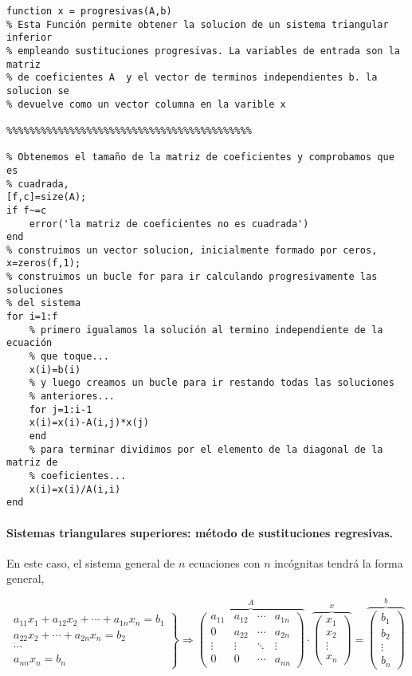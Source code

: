 \begin{lstlisting}
function x = progresivas(A,b)
% Esta Función permite obtener la solucion de un sistema triangular inferior
% empleando sustituciones progresivas. La variables de entrada son la matriz
% de coeficientes A  y el vector de terminos independientes b. la solucion se
% devuelve como un vector columna en la varible x

%%%%%%%%%%%%%%%%%%%%%%%%%%%%%%%%%%%%%%%%%%%

% Obtenemos el tamaño de la matriz de coeficientes y comprobamos que es
% cuadrada,
[f,c]=size(A);
if f~=c
    error('la matriz de coeficientes no es cuadrada')
end
% construimos un vector solucion, inicialmente formado por ceros,
x=zeros(f,1);
% construimos un bucle for para ir calculando progresivamente las soluciones
% del sistema
for i=1:f
    % primero igualamos la solución al termino independiente de la ecuación
    % que toque...
    x(i)=b(i)
    % y luego creamos un bucle para ir restando todas las soluciones
    % anteriores...
    for j=1:i-1
    x(i)=x(i)-A(i,j)*x(j)
    end
    % para terminar dividimos por el elemento de la diagonal de la matriz de
    % coeficientes...
    x(i)=x(i)/A(i,i)
end
\end{lstlisting}

\paragraph{Sistemas triangulares superiores: método de sustituciones regresivas.} En este caso, el sistema general de $n$ ecuaciones con $n$ incógnitas tendrá la forma general,

\begin{equation*}
\left. \begin{aligned}
a_{11}x_1+a_{12}x_2+\cdots +a_{1n}x_n=b_1\\
a_{22}x_2+\cdots +a_{2n}x_n=b_2\\
\cdots  \\
a_{nn}x_n=b_n
\end{aligned}\right\} \Rightarrow	\overbrace{\begin{pmatrix}
a_{11}& a_{12}& \cdots & a_{1n}\\
0& a_{22}& \cdots & a_{2n}\\
\vdots & \vdots & \ddots & \vdots\\
0& 0& \cdots & a_{nn}
\end{pmatrix}}^A \cdot \overbrace{\begin{pmatrix}
x_1\\
x_2\\
\vdots \\
x_n
\end{pmatrix}}^x=\overbrace{\begin{pmatrix}
b_1\\
b_2\\
\vdots \\
b_n
\end{pmatrix}}^b
\end{equation*}



